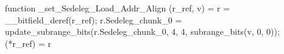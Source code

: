 function _set_Sedeleg_Load_Addr_Align (r_ref, v) = {
    r = __bitfield_deref(r_ref);
    r.Sedeleg_chunk_0 = update_subrange_bits(r.Sedeleg_chunk_0, 4, 4, subrange_bits(v, 0, 0));
    (*r_ref) = r
}
